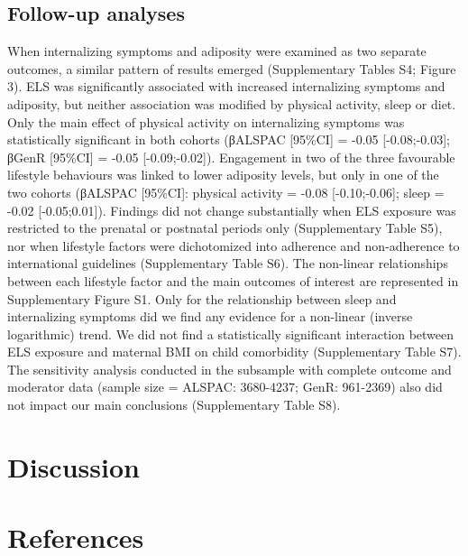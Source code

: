 \documentclass[
  letterpaper,
  DIV=11,
  numbers=noendperiod]{scrreport}
\begin{document}
\subsection{Follow-up analyses}\label{follow-up-analyses-2}

When internalizing symptoms and adiposity were examined as two separate
outcomes, a similar pattern of results emerged (Supplementary Tables S4;
Figure 3). ELS was significantly associated with increased internalizing
symptoms and adiposity, but neither association was modified by physical
activity, sleep or diet. Only the main effect of physical activity on
internalizing symptoms was statistically significant in both cohorts
(βALSPAC {[}95\%CI{]} = -0.05 {[}-0.08;-0.03{]}; βGenR {[}95\%CI{]} =
-0.05 {[}-0.09;-0.02{]}). Engagement in two of the three favourable
lifestyle behaviours was linked to lower adiposity levels, but only in
one of the two cohorts (βALSPAC {[}95\%CI{]}: physical activity = -0.08
{[}-0.10;-0.06{]}; sleep = -0.02 {[}-0.05;0.01{]}). Findings did not
change substantially when ELS exposure was restricted to the prenatal or
postnatal periods only (Supplementary Table S5), nor when lifestyle
factors were dichotomized into adherence and non-adherence to
international guidelines (Supplementary Table S6). The non-linear
relationships between each lifestyle factor and the main outcomes of
interest are represented in Supplementary Figure S1. Only for the
relationship between sleep and internalizing symptoms did we find any
evidence for a non-linear (inverse logarithmic) trend. We did not find a
statistically significant interaction between ELS exposure and maternal
BMI on child comorbidity (Supplementary Table S7). The sensitivity
analysis conducted in the subsample with complete outcome and moderator
data (sample size = ALSPAC: 3680-4237; GenR: 961-2369) also did not
impact our main conclusions (Supplementary Table S8).

\section{Discussion}\label{discussion-1}

\section*{References}\label{references-2}

\end{document}
